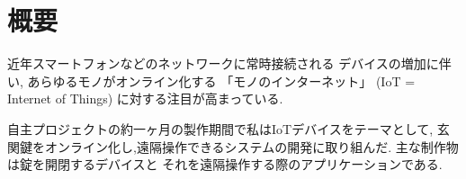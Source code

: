 \section{概要}
近年スマートフォンなどのネットワークに常時接続される
デバイスの増加に伴い, あらゆるモノがオンライン化する
「モノのインターネット」 (IoT = Internet of Things)
に対する注目が高まっている.~\cite{intro-iot}

自主プロジェクトの約一ヶ月の製作期間で私はIoTデバイスをテーマとして,
玄関鍵をオンライン化し,遠隔操作できるシステムの開発に取り組んだ.
主な制作物は錠を開閉するデバイスと
それを遠隔操作する際のアプリケーションである.

